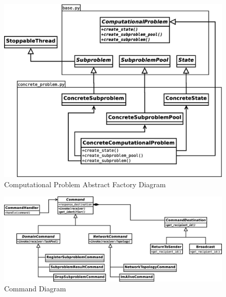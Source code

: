 \documentclass{article}
\begin{document}
\begin{figure}[H]
	\centering
	\includegraphics[width=\linewidth]{diagrams/FactoryDiagram.eps}
	\caption{Computational Problem Abstract Factory Diagram}
\end{figure}

\begin{figure}[H]
	\centering
	\includegraphics[width=\linewidth]{diagrams/CommandDiagram.eps}
	\caption{Command Diagram}
\end{figure}

\newpage
\end{document}

